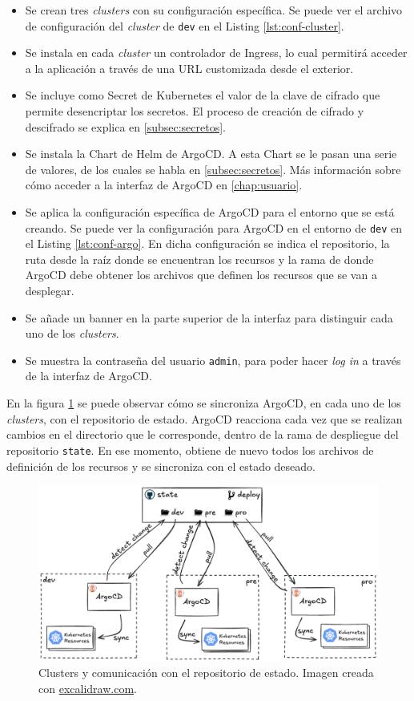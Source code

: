 \begin{itemize}
  \item Se crean tres \textit{clusters} con su configuración específica. Se puede ver el archivo de configuración del \textit{cluster} de \texttt{dev} en el Listing \ref{lst:conf-cluster}.
  \item Se instala en cada \textit{cluster} un controlador de Ingress, lo cual permitirá acceder a la aplicación a través de una URL customizada desde el exterior.
  \item Se incluye como Secret de Kubernetes el valor de la clave de cifrado que permite desencriptar los secretos. El proceso de creación de cifrado y descifrado se explica en \ref{subsec:secretos}.
  \item Se instala la Chart de Helm de ArgoCD. A esta Chart se le pasan una serie de valores, de los cuales se habla en \ref{subsec:secretos}. Más información sobre cómo acceder a la interfaz de ArgoCD en \ref{chap:usuario}.
  \item Se aplica la configuración específica de ArgoCD para el entorno que se está creando. Se puede ver la configuración para ArgoCD en el entorno de \texttt{dev} en el Listing \ref{lst:conf-argo}. En dicha configuración se indica el repositorio, la ruta desde la raíz donde se encuentran los recursos y la rama de donde ArgoCD debe obtener los archivos que definen los recursos que se van a desplegar.
  \item Se añade un banner en la parte superior de la interfaz para distinguir cada uno de los \textit{clusters}.
  \item Se muestra la contraseña del usuario \texttt{admin}, para poder hacer \textit{log in} a través de la interfaz de ArgoCD.
\end{itemize}

En la figura \ref{fig:clusters} se puede observar cómo se sincroniza ArgoCD, en cada uno de los \textit{clusters}, con el repositorio de estado. ArgoCD reacciona cada vez que se realizan cambios en el directorio que le corresponde, dentro de la rama de despliegue del repositorio \texttt{state}. En ese momento, obtiene de nuevo todos los archivos de definición de los recursos y se sincroniza con el estado deseado.

\begin{figure}
  \centerline{\includegraphics[width=15cm]{figuras/clusters}}
  \caption{Clusters y comunicación con el repositorio de estado. Imagen creada con \href{https://excalidraw.com}{excalidraw.com}.}
  \label{fig:clusters}
\end{figure}


